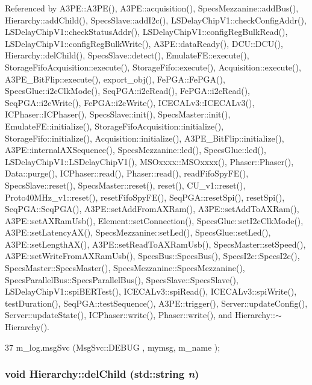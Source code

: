 Referenced by A3PE::A3PE(), A3PE::acquisition(), SpecsMezzanine::addBus(), Hierarchy::addChild(), SpecsSlave::addI2c(), LSDelayChipV1::checkConfigAddr(), LSDelayChipV1::checkStatusAddr(), LSDelayChipV1::configRegBulkRead(), LSDelayChipV1::configRegBulkWrite(), A3PE::dataReady(), DCU::DCU(), Hierarchy::delChild(), SpecsSlave::detect(), EmulateFE::execute(), StorageFifoAcquisition::execute(), StorageFifo::execute(), Acquisition::execute(), A3PE\_\-BitFlip::execute(), export\_\-obj(), FePGA::FePGA(), SpecsGlue::i2cClkMode(), SeqPGA::i2cRead(), FePGA::i2cRead(), SeqPGA::i2cWrite(), FePGA::i2cWrite(), ICECALv3::ICECALv3(), ICPhaser::ICPhaser(), SpecsSlave::init(), SpecsMaster::init(), EmulateFE::initialize(), StorageFifoAcquisition::initialize(), StorageFifo::initialize(), Acquisition::initialize(), A3PE\_\-BitFlip::initialize(), A3PE::internalAXSequence(), SpecsMezzanine::led(), SpecsGlue::led(), LSDelayChipV1::LSDelayChipV1(), MSOxxxx::MSOxxxx(), Phaser::Phaser(), Data::purge(), ICPhaser::read(), Phaser::read(), readFifoSpyFE(), SpecsSlave::reset(), SpecsMaster::reset(), reset(), CU\_\-v1::reset(), Proto40MHz\_\-v1::reset(), resetFifoSpyFE(), SeqPGA::resetSpi(), resetSpi(), SeqPGA::SeqPGA(), A3PE::setAddFromAXRam(), A3PE::setAddToAXRam(), A3PE::setAXRamUsb(), Element::setConnection(), SpecsGlue::setI2cClkMode(), A3PE::setLatencyAX(), SpecsMezzanine::setLed(), SpecsGlue::setLed(), A3PE::setLengthAX(), A3PE::setReadToAXRamUsb(), SpecsMaster::setSpeed(), A3PE::setWriteFromAXRamUsb(), SpecsBus::SpecsBus(), SpecsI2c::SpecsI2c(), SpecsMaster::SpecsMaster(), SpecsMezzanine::SpecsMezzanine(), SpecsParallelBus::SpecsParallelBus(), SpecsSlave::SpecsSlave(), LSDelayChipV1::spiBERTest(), ICECALv3::spiRead(), ICECALv3::spiWrite(), testDuration(), SeqPGA::testSequence(), A3PE::trigger(), Server::updateConfig(), Server::updateState(), ICPhaser::write(), Phaser::write(), and Hierarchy::$\sim$Hierarchy().


\begin{DoxyCode}
37 { m_log.msgSvc (MsgSvc::DEBUG   , mymsg, m_name ); }
\end{DoxyCode}
\hypertarget{classHierarchy_a1928ac7615fe0b5e55cd707f70dc6781}{
\subsubsection[{delChild}]{\setlength{\rightskip}{0pt plus 5cm}void Hierarchy::delChild (std::string {\em n})}}
\label{classHierarchy_a1928ac7615fe0b5e55cd707f70dc6781}


